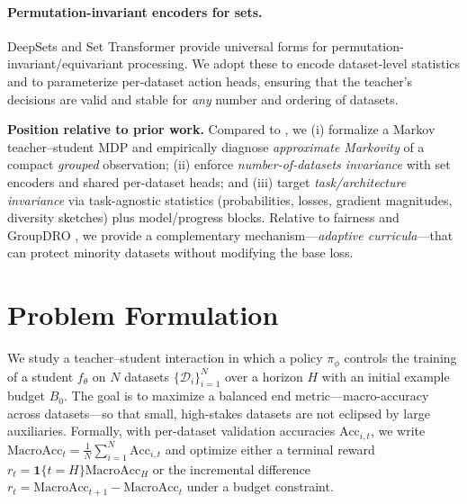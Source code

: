 \documentclass[11pt]{article}
\newcommand{\MacroAcc}{\mathrm{MacroAcc}}
\newcommand{\1}{\mathbf{1}}
\begin{document}
\paragraph{Permutation-invariant encoders for sets.}
DeepSets \citep{zaheer2017deepsets} and Set Transformer \citep{lee2019settransformer} provide universal forms for permutation-invariant/equivariant processing. We adopt these to encode dataset-level statistics and to parameterize per-dataset action heads, ensuring that the teacher’s decisions are valid and stable for \emph{any} number and ordering of datasets.

\medskip
\noindent\textbf{Position relative to prior work.}
Compared to \citet{fan2018l2t,wu2018l2tloss}, we (i) formalize a Markov teacher--student MDP and empirically diagnose \emph{approximate Markovity} of a compact \emph{grouped} observation; (ii) enforce \emph{number-of-datasets invariance} with set encoders and shared per-dataset heads; and (iii) target \emph{task/architecture invariance} via task-agnostic statistics (probabilities, losses, gradient magnitudes, diversity sketches) plus model/progress blocks. Relative to fairness and GroupDRO \citep{hashimoto2018fairness,sagawa2020dro}, we provide a complementary mechanism—\emph{adaptive curricula}—that can protect minority datasets without modifying the base loss.

\section{Problem Formulation}
We study a teacher--student interaction in which a policy $\pi_\phi$ controls the training of a student $f_\theta$ on $N$ datasets $\{\mathcal{D}_i\}_{i=1}^N$ over a horizon $H$ with an initial example budget $B_0$. The goal is to maximize a balanced end metric---macro-accuracy across datasets---so that small, high-stakes datasets are not eclipsed by large auxiliaries. Formally, with per-dataset validation accuracies $\mathrm{Acc}_{i,t}$, we write $\MacroAcc_t=\frac{1}{N}\sum_{i=1}^N \mathrm{Acc}_{i,t}$ and optimize either a terminal reward $r_t=\1\{t=H\}\MacroAcc_H$ or the incremental difference $r_t=\MacroAcc_{t+1}-\MacroAcc_{t}$ under a budget constraint.
\end{document}
